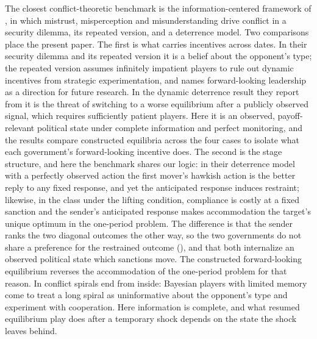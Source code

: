 The closest conflict-theoretic benchmark is the information-centered
framework of \citet{AcemogluWolitzkyMistrust}, in which mistrust,
misperception and misunderstanding drive conflict in a security dilemma, its
repeated version, and a deterrence model. Two comparisons place the present
paper. The first is what carries incentives across dates. In their security
dilemma and its repeated version it is a belief about the opponent's type; the
repeated version assumes infinitely impatient players to rule out dynamic
incentives from strategic experimentation, and names forward-looking leadership
as a direction for future research. In the dynamic deterrence result they report
from \citet[Theorem~2]{Wolitzky2023} it is the threat of switching to a worse
equilibrium after a publicly observed signal, which requires sufficiently
patient players. Here it
is an observed, payoff-relevant political state under complete information
and perfect monitoring, and the results compare constructed equilibria across
the four cases to isolate what each government's
forward-looking incentive does. The second is the stage structure, and here the benchmark
shares our logic: in their deterrence model with a perfectly observed action
the first mover's hawkish action is the better reply to any fixed response,
and yet the anticipated response induces restraint; likewise, in the class under
the lifting condition, compliance is costly at a fixed sanction and the sender's anticipated
response makes accommodation the target's unique optimum in the one-period problem. The difference is
that the sender ranks the two diagonal outcomes the
other way, so the two governments do not share a preference
for the restrained outcome (), and that
both internalize an observed political state which sanctions move. The
constructed forward-looking equilibrium reverses the accommodation of the one-period problem for
that reason. In
\citet{AcemogluWolitzky2014} conflict spirals end from inside: Bayesian
players with limited memory come to treat a long spiral as uninformative about
the opponent's type and experiment with cooperation. Here information is
complete, and what resumed equilibrium
play does after a temporary shock depends on the state the shock leaves
behind.


